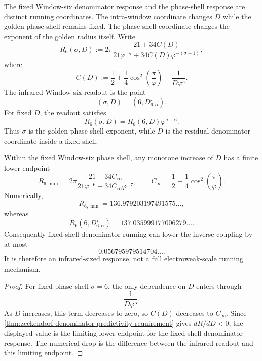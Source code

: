 \begin{principle}
\label{prin:zeckendorf-phase-shell-running-coordinate}
The fixed Window-six denominator response and the phase-shell response
are distinct running coordinates. The intra-window coordinate changes
$D$ while the golden phase shell remains fixed. The phase-shell
coordinate changes the exponent of the golden radius itself. Write
$$
  R_6(\sigma,D)
  :=
  2\pi
  \frac{
    21+34C(D)
  }{
    21\varphi^{-\sigma}
    +
    34C(D)\varphi^{-(\sigma+1)}
  },
$$
where
$$
  C(D)
  :=
  \frac12
  +
  \frac14\cos^2\left(\frac{\pi}{\varphi}\right)
  +
  \frac{1}{D\varphi^5}.
$$
The infrared Window-six readout is the point
$$
  (\sigma,D)=(6,D_{6,\alpha}^{\star}).
$$
For fixed $D$, the readout satisfies
$$
  R_6(\sigma,D)
  =
  R_6(6,D)\varphi^{\sigma-6}.
$$
Thus $\sigma$ is the golden phase-shell exponent, while $D$ is the
residual denominator coordinate inside a fixed shell.
\end{principle}


\begin{theorem}
\label{thm:zeckendorf-fixed-window-six-denominator-running-bound}
Within the fixed Window-six phase shell, any monotone increase of $D$
has a finite lower endpoint
$$
  R_{6,\min}
  =
  2\pi
  \frac{
    21+34C_\infty
  }{
    21\varphi^{-6}
    +
    34C_\infty\varphi^{-7}
  },
  \qquad
  C_\infty
  =
  \frac12
  +
  \frac14\cos^2\left(\frac{\pi}{\varphi}\right).
$$
Numerically,
$$
  R_{6,\min}
  =
  136.979203197491575\ldots,
$$
whereas
$$
  R_6(6,D_{6,\alpha}^{\star})
  =
  137.035999177006279\ldots.
$$
Consequently fixed-shell denominator running can lower the inverse
coupling by at most
$$
  0.056795979514704\ldots.
$$
It is therefore an infrared-sized response, not a full electroweak-scale
running mechanism.
\end{theorem}
\begin{proof}
For fixed phase shell $\sigma=6$, the only dependence on $D$ enters
through
$$
  \frac{1}{D\varphi^5}.
$$
As $D$ increases, this term decreases to zero, so $C(D)$ decreases to
$C_\infty$. Since
\autoref{thm:zeckendorf-denominator-predictivity-requirement} gives
$dR/dD<0$, the displayed value is the limiting lower endpoint for the
fixed-shell denominator response. The numerical drop is the difference
between the infrared readout and this limiting endpoint.
\end{proof}

